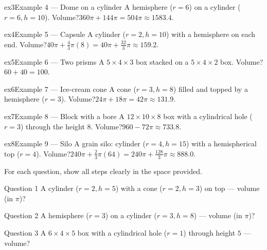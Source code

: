 \documentclass[11pt]{article}
\begin{document}
\begin{example}{ex3}{Example 4 --- Dome on a cylinder}
A hemisphere ($r=6$) on a cylinder ($r=6,h=10$). Volume?\soln $360\pi+144\pi=504\pi\approx1583.4$.
\end{example}

\begin{example}{ex4}{Example 5 --- Capsule}
A cylinder ($r=2,h=10$) with a hemisphere on each end. Volume?\soln $40\pi+\tfrac43\pi(8)=40\pi+\tfrac{32}{3}\pi\approx159.2$.
\end{example}

\begin{example}{ex5}{Example 6 --- Two prisms}
A $5\times4\times3$ box stacked on a $5\times4\times2$ box. Volume?\soln $60+40=100$.
\end{example}

\begin{example}{ex6}{Example 7 --- Ice-cream cone}
A cone ($r=3,h=8$) filled and topped by a hemisphere ($r=3$). Volume?\soln $24\pi+18\pi=42\pi\approx131.9$.
\end{example}

\begin{example}{ex7}{Example 8 --- Block with a bore}
A $12\times10\times8$ box with a cylindrical hole ($r=3$) through the height $8$. Volume?\soln $960-72\pi\approx733.8$.
\end{example}

\begin{example}{ex8}{Example 9 --- Silo}
A grain silo: cylinder ($r=4,h=15$) with a hemispherical top ($r=4$). Volume?\soln $240\pi+\tfrac23\pi(64)=240\pi+\tfrac{128}{3}\pi\approx888.0$.
\end{example}

\clearpage
{}
For each question, show all steps clearly in the space provided.

\begin{qbox}{Question 1}
A cylinder ($r=2,h=5$) with a cone ($r=2,h=3$) on top — volume (in $\pi$)?\workspace{2.4cm}
\end{qbox}

\begin{qbox}{Question 2}
A hemisphere ($r=3$) on a cylinder ($r=3,h=8$) — volume (in $\pi$)?\workspace{2.4cm}
\end{qbox}

\begin{qbox}{Question 3}
A $6\times4\times5$ box with a cylindrical hole ($r=1$) through height $5$ — volume?\workspace{2.4cm}
\end{qbox}
\end{document}
